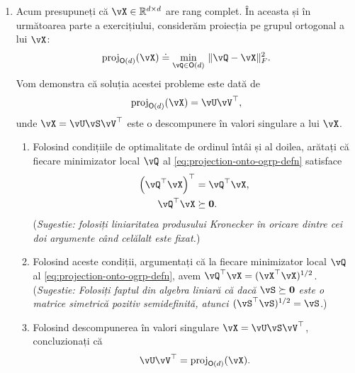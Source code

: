 \documentclass[../../book-main_ro.tex]{subfiles}
\begin{document}
\begin{exercise}
\begin{enumerate}
        \item Acum presupuneți că $\vX \in \R^{d\times d}$ are rang complet. În aceasta și în următoarea parte a exercițiului, considerăm proiecția pe grupul ortogonal a lui $\vX$:
        \begin{equation}\label{eq:projection-onto-ogrp-defn}
            \mathrm{proj}_{\O(d)}(\vX) \doteq
            \min_{\vQ \in \O(d)
            }\, \norm{\vQ - \vX}_F^2.
        \end{equation}
        Vom demonstra că soluția acestei probleme este dată de
        \begin{equation*}
            \mathrm{proj}_{\O(d)}(\vX)
            =
            \vU \vV^\top,
        \end{equation*}
        unde $\vX = \vU \vS \vV^\top$ este o descompunere în valori singulare a lui $\vX$.

        \begin{enumerate}
            \item Folosind condițiile de optimalitate de ordinul întâi și al doilea, arătați că fiecare minimizator local $\vQ$ al \eqref{eq:projection-onto-ogrp-defn} satisface
            \begin{align*}
                \left( \vQ^\top \vX \right)^\top &= \vQ^\top \vX, \\
                \vQ^\top \vX &\succeq \mathbf{0}.
            \end{align*}
            (\textit{Sugestie: folosiți liniaritatea produsului Kronecker în oricare dintre cei doi argumente când celălalt este fixat.})
            \item Folosind aceste condiții, argumentați că la fiecare minimizator local $\vQ$ al \eqref{eq:projection-onto-ogrp-defn}, avem $\vQ^\top \vX = (\vX^\top \vX)^{1/2}$.
            (\textit{Sugestie: Folosiți %
            faptul din algebra liniară că dacă $\vS \succeq \mathbf{0}$ este o matrice simetrică pozitiv semidefinită, atunci $(\vS^\top\vS)^{1/2} = \vS$.})
            \item Folosind descompunerea în valori singulare $\vX = \vU \vS \vV^\top$, concluzionați că
            \begin{equation*}
                \vU \vV^\top
                =
                \mathrm{proj}_{\O(d)}(\vX).
            \end{equation*}
        \end{enumerate}
    \end{enumerate}
\end{exercise}
\end{document}
